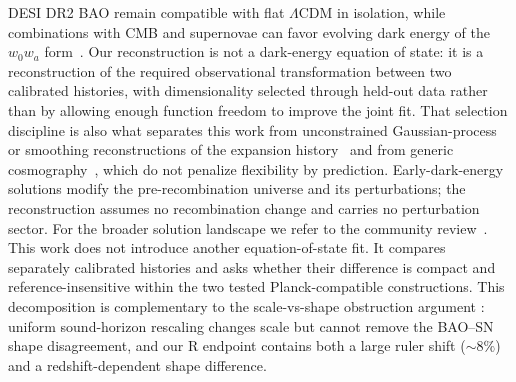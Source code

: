 DESI DR2 BAO remain compatible with flat $\Lambda$CDM in isolation,
while combinations with CMB and supernovae can favor evolving dark
energy of the $w_{0}w_{a}$ form~\citep{DESIDR2,
Chevallier2001,Linder2003}. Our reconstruction is not a dark-energy equation of
state: it is a reconstruction of the
required observational transformation between two calibrated
histories, with dimensionality selected through held-out data rather
than by allowing enough function freedom to improve the joint fit.
That selection discipline is also what separates this work from
unconstrained Gaussian-process or smoothing reconstructions of the
expansion history~\cite{Shafieloo2006} and from generic
cosmography~\cite{Cattoen2007}, which do not penalize flexibility by
prediction. Early-dark-energy solutions modify the pre-recombination
universe and its perturbations; the reconstruction assumes no recombination
change and carries no perturbation sector. For the broader solution
landscape we refer to the community review~\cite{DiValentino2021}.
This work does not introduce another
equation-of-state fit. It compares separately calibrated histories
and asks whether their difference is compact and
reference-insensitive within the two tested Planck-compatible
constructions. This decomposition is complementary to the scale-vs-shape
obstruction argument \citep{Zhou2026}: uniform sound-horizon rescaling
changes scale but cannot remove the BAO--SN shape disagreement, and our
R endpoint contains both a large ruler shift ($\sim8\%$) and a
redshift-dependent shape difference.
